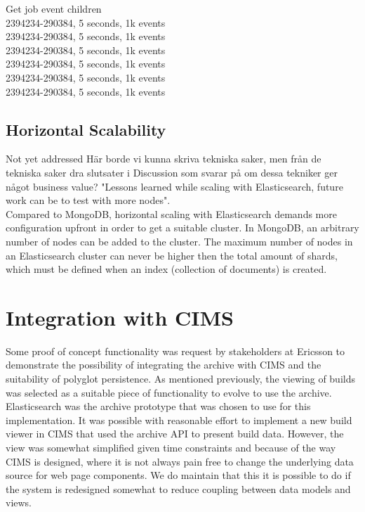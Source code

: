 Get job event children \\
2394234-290384, 5 seconds, 1k events \\
2394234-290384, 5 seconds, 1k events \\
2394234-290384, 5 seconds, 1k events \\
2394234-290384, 5 seconds, 1k events \\
2394234-290384, 5 seconds, 1k events \\
2394234-290384, 5 seconds, 1k events \\

\subsection{Horizontal Scalability}
Not yet addressed
Här borde vi kunna skriva tekniska saker, men från de tekniska saker dra slutsater i Discussion som svarar på om dessa tekniker ger något business value?
"Lessons learned while scaling with Elasticsearch, future work can be to test with more nodes".\\
Compared to MongoDB, horizontal scaling with Elasticsearch demands more configuration upfront in order to get a suitable cluster.
In MongoDB, an arbitrary number of nodes can be added to the cluster. The maximum number of nodes in an Elasticsearch cluster can never be higher then the total amount of shards, which must be defined when an index (collection of documents) is created.



\section{Integration with CIMS}
Some proof of concept functionality was request by stakeholders at Ericsson to demonstrate the possibility of integrating the archive with CIMS and the suitability of polyglot persistence. As mentioned previously, the viewing of builds was selected as a suitable piece of functionality to evolve to use the archive. Elasticsearch was the archive prototype that was chosen to use for this implementation. It was possible with reasonable effort to implement a new build viewer in CIMS that used the archive API to present build data. However, the view was somewhat simplified given time constraints and because of the way CIMS is designed, where it is not always pain free to change the underlying data source for web page components. We do maintain that this it is possible to do if the system is redesigned somewhat to reduce coupling between data models and views.

